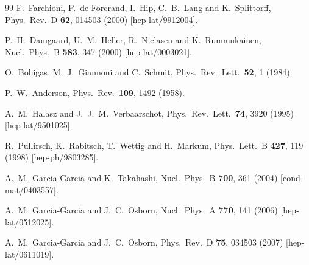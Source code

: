 \documentclass[twocolumn, prd, preprintnumbers, amsmath,
  amssymb, showpacs, floatfix]{revtex4-1}
\begin{document}
\begin{thebibliography}{99}
  F.~Farchioni, P.~de Forcrand, I.~Hip, C.~B.~Lang and K.~Splittorff,
  Phys.\ Rev.\ D {\bf 62}, 014503 (2000)
  [hep-lat/9912004].

  P.~H.~Damgaard, U.~M.~Heller, R.~Niclasen and K.~Rummukainen,
  Nucl.\ Phys.\ B {\bf 583}, 347 (2000)
  [hep-lat/0003021].

  O.~Bohigas, M.~J.~Giannoni and C.~Schmit,
  Phys.\ Rev.\ Lett.\  {\bf 52}, 1 (1984).

  P.~W.~Anderson,
  Phys.\ Rev.\  {\bf 109}, 1492 (1958).

  A.~M.~Halasz and J.~J.~M.~Verbaarschot,
  Phys.\ Rev.\ Lett.\  {\bf 74}, 3920 (1995)
  [hep-lat/9501025].

  R.~Pullirsch, K.~Rabitsch, T.~Wettig and H.~Markum,
  Phys.\ Lett.\ B {\bf 427}, 119 (1998)
  [hep-ph/9803285].

  A.~M.~Garcia-Garcia and K.~Takahashi,
  Nucl.\ Phys.\ B {\bf 700}, 361 (2004)
  [cond-mat/0403557].

  A.~M.~Garcia-Garcia and J.~C.~Osborn,
  Nucl.\ Phys.\ A {\bf 770}, 141 (2006)
  [hep-lat/0512025].

  A.~M.~Garcia-Garcia and J.~C.~Osborn,
  Phys.\ Rev.\ D {\bf 75}, 034503 (2007)
  [hep-lat/0611019].


\end{thebibliography}
\end{document}
